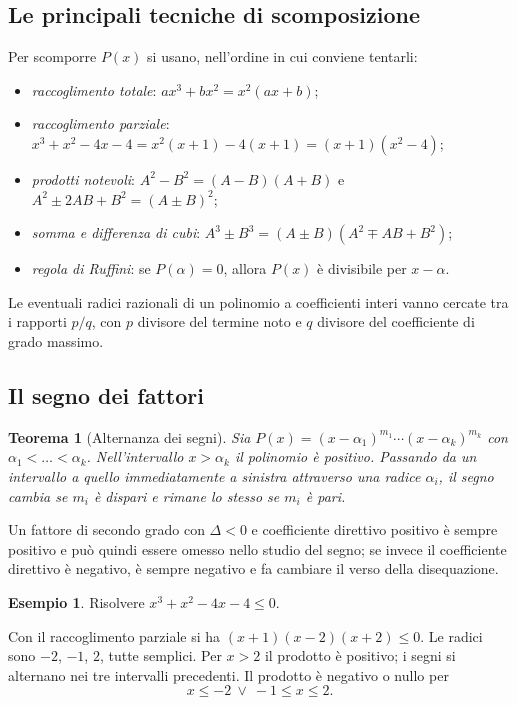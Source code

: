 \documentclass[12pt,a4paper,openany]{book}
\theoremstyle{definition}
\newtheorem{esempio}{Esempio}[section]
\theoremstyle{plain}
\newtheorem{teorema}{Teorema}[section]
\theoremstyle{remark}
\begin{document}
\subsection*{Le principali tecniche di scomposizione}

Per scomporre $P(x)$ si usano, nell'ordine in cui conviene tentarli:
\begin{itemize}
\item \emph{raccoglimento totale}: $ax^3+bx^2=x^2(ax+b)$;
\item \emph{raccoglimento parziale}: $x^3+x^2-4x-4=x^2(x+1)-4(x+1)=(x+1)(x^2-4)$;
\item \emph{prodotti notevoli}: $A^2-B^2=(A-B)(A+B)$ e $A^2\pm 2AB+B^2=(A\pm B)^2$;
\item \emph{somma e differenza di cubi}: $A^3\pm B^3=(A\pm B)(A^2\mp AB+B^2)$;
\item \emph{regola di Ruffini}: se $P(\alpha)=0$, allora $P(x)$ è divisibile per $x-\alpha$.
\end{itemize}
Le eventuali radici razionali di un polinomio a coefficienti interi vanno cercate tra i rapporti $p/q$, con $p$ divisore del termine noto e $q$ divisore del coefficiente di grado massimo.

\subsection*{Il segno dei fattori}

\begin{teorema}[Alternanza dei segni]
Sia $P(x)=(x-\alpha_1)^{m_1}\cdots(x-\alpha_k)^{m_k}$ con $\alpha_1<\dots<\alpha_k$. Nell'intervallo $x>\alpha_k$ il polinomio è positivo. Passando da un intervallo a quello immediatamente a sinistra attraverso una radice $\alpha_i$, il segno cambia se $m_i$ è dispari e rimane lo stesso se $m_i$ è pari.
\end{teorema}

Un fattore di secondo grado con $\Delta<0$ e coefficiente direttivo positivo è sempre positivo e può quindi essere omesso nello studio del segno; se invece il coefficiente direttivo è negativo, è sempre negativo e fa cambiare il verso della disequazione.

\begin{esempio}
Risolvere $x^3+x^2-4x-4\le 0$.

Con il raccoglimento parziale si ha $(x+1)(x-2)(x+2)\le 0$. Le radici sono $-2$, $-1$, $2$, tutte semplici. Per $x>2$ il prodotto è positivo; i segni si alternano nei tre intervalli precedenti. Il prodotto è negativo o nullo per
\[
x\le -2\ \lor\ -1\le x\le 2.
\]
\end{esempio}
\end{document}
